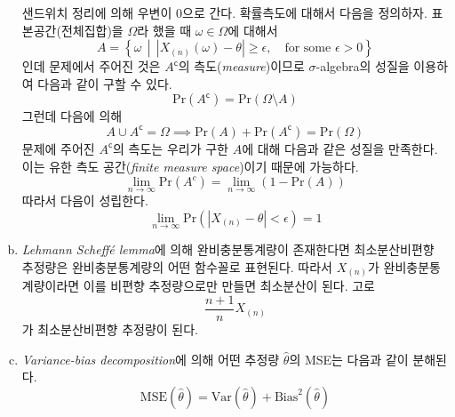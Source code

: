 \documentclass[answers]{exam}
\begin{document}
\begin{questions}
\begin{solution}
\begin{enumerate}[(a)]
\begin{equation}
        \end{equation}
        샌드위치 정리에 의해 우변이 0으로 간다. 확률측도에 대해서 다음을 정의하자. 표본공간(전체집합)을 $\Omega$라 했을 때 $\omega\in\Omega$에 대해서
        \begin{equation}
          A = \left\{\omega\,\middle|\,\left|X_{\left(n\right)}\left(\omega\right)-\theta\right|\geq \epsilon,\quad \text{for some } \epsilon>0 \right\}
        \end{equation}
        인데 문제에서 주어진 것은 $A^{\mathsf{c}}$의 측도(\emph{measure})이므로 $\sigma$-algebra의 성질을 이용하여 다음과 같이 구할 수 있다.
        \begin{equation}
          \mathrm{Pr}\left(A^{\mathsf{c}}\right) = \mathrm{Pr}\left(\Omega\setminus A\right)
        \end{equation}
        그런데 다음에 의해
        \begin{equation}
          A\cup A^{\mathsf{c}}=\Omega \implies \mathrm{Pr}\left(A\right)+\mathrm{Pr}\left(A^{\mathsf{c}}\right)=\mathrm{Pr}\left(\Omega\right)
        \end{equation}
        문제에 주어진 $A^{\mathsf{c}}$의 측도는 우리가 구한 $A$에 대해 다음과 같은 성질을 만족한다. 이는 유한 측도 공간(\emph{finite measure space})이기 때문에 가능하다.
        \begin{equation}
          \lim_{n\to\infty}\mathrm{Pr}\left(A^{c}\right)=\lim_{n\to\infty}\left(1-\mathrm{Pr}\left(A\right)\right)
        \end{equation}
        따라서 다음이 성립한다.
        \begin{equation}
          \lim_{n\to\infty}\mathrm{Pr}\left(\left|X_{\left(n\right)}-\theta\right|<\epsilon\right)=1
        \end{equation}
        \item \emph{Lehmann Scheffé lemma}에 의해 완비충분통계량이 존재한다면 최소분산비편향 추정량은 완비충분통계량의 어떤 함수꼴로 표현된다. 따라서 $X_{\left(n\right)}$가 완비충분통계량이라면 이를 비편향 추정량으로만 만들면 최소분산이 된다. 고로
        \begin{equation}
          \dfrac{n+1}{n}X_{\left(n\right)}
        \end{equation}
        가 최소분산비편향 추정량이 된다.
        \item \emph{Variance-bias decomposition}에 의해 어떤 추정량 $\widehat{\theta}$의 MSE는 다음과 같이 분해된다.
        \begin{equation}
          \mathrm{MSE}\left(\widehat{\theta}\right) = \mathrm{Var}\left(\widehat{\theta}\right)+\mathrm{Bias}^{2}\left(\widehat{\theta}\right)

\end{equation}
\end{enumerate}
\end{solution}
\end{questions}
\end{document}

